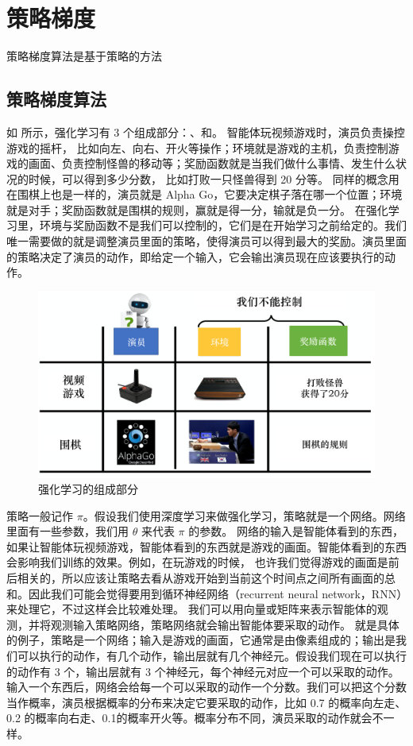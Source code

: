 \section{策略梯度}
策略梯度算法是基于策略的方法
\subsection{策略梯度算法}
如 所示，强化学习有 3 个组成部分：、和。
智能体玩视频游戏时，演员负责操控游戏的摇杆， 比如向左、向右、开火等操作；环境就是游戏的主机，负责控制游戏的画面、负责控制怪兽的移动等；奖励函数就是当我们做什么事情、发生什么状况的时候，可以得到多少分数， 比如打败一只怪兽得到 20 分等。
同样的概念用在围棋上也是一样的，演员就是 Alpha Go，它要决定棋子落在哪一个位置；环境就是对手；奖励函数就是围棋的规则，赢就是得一分，输就是负一分。
在强化学习里，环境与奖励函数不是我们可以控制的，它们是在开始学习之前给定的。我们唯一需要做的就是调整演员里面的策略，使得演员可以得到最大的奖励。演员里面的策略决定了演员的动作，即给定一个输入，它会输出演员现在应该要执行的动作。
\begin{figure}[hbt]
    \centering
    \includegraphics[width=0.5\linewidth]{res/ch4/4.1}
    \caption{强化学习的组成部分}
    \label{fig:fig4.1}
\end{figure}


策略一般记作 $\pi$。假设我们使用深度学习来做强化学习，策略就是一个网络。网络里面有一些参数，我们用 $\theta$ 来代表 $\pi$ 的参数。
网络的输入是智能体看到的东西，如果让智能体玩视频游戏，智能体看到的东西就是游戏的画面。智能体看到的东西会影响我们训练的效果。例如，在玩游戏的时候， 也许我们觉得游戏的画面是前后相关的，所以应该让策略去看从游戏开始到当前这个时间点之间所有画面的总和。因此我们可能会觉得要用到循环神经网络（recurrent neural network，RNN）来处理它，不过这样会比较难处理。
我们可以用向量或矩阵来表示智能体的观测，并将观测输入策略网络，策略网络就会输出智能体要采取的动作。
 就是具体的例子，策略是一个网络；输入是游戏的画面，它通常是由像素组成的；输出是我们可以执行的动作，有几个动作，输出层就有几个神经元。假设我们现在可以执行的动作有 3 个，输出层就有 3 个神经元，每个神经元对应一个可以采取的动作。输入一个东西后，网络会给每一个可以采取的动作一个分数。我们可以把这个分数当作概率，演员根据概率的分布来决定它要采取的动作，比如 0.7 的概率向左走、0.2 的概率向右走、0.1的概率开火等。概率分布不同，演员采取的动作就会不一样。

